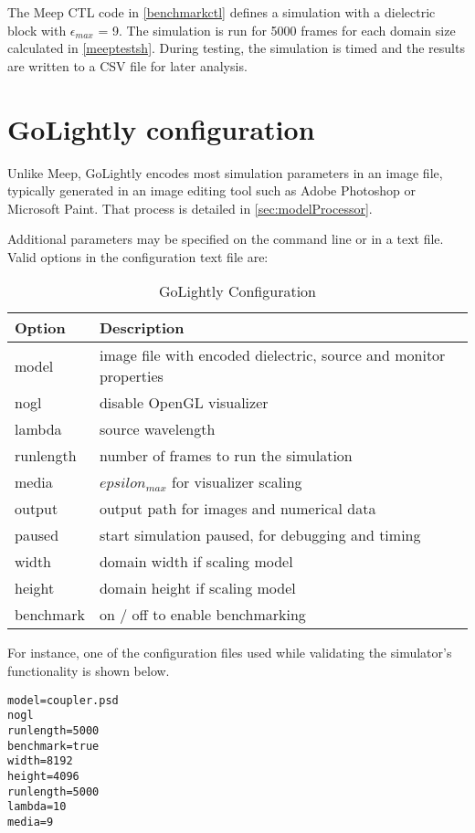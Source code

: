 


The Meep CTL code in \autoref{benchmarkctl} defines a simulation with a dielectric block with $\epsilon_{max}$ = 9. The simulation is run for 5000 frames for each domain size calculated in \autoref{meeptestsh}. During testing, the simulation is timed and the results are written to a CSV file for later analysis. 



\section{GoLightly configuration}

Unlike Meep, GoLightly encodes most simulation parameters in an image file, typically generated in an image editing tool such as Adobe Photoshop or Microsoft Paint. That process is detailed in \autoref{sec:modelProcessor}. 

Additional parameters may be specified on the command line or in a text file. Valid options in the configuration text file are:

\begin{table}[h!]
	\label{golightlyConfig}
	\centering
	\caption{GoLightly Configuration}
	\label{tab:golightlyConfigTerms}
	\begin{tabular}{l | l}
		Option	& Description \\
		\hline
			model     & image file with encoded dielectric, source and monitor properties \\
			nogl      & disable OpenGL visualizer										  \\
			lambda    & source wavelength												  \\
			runlength & number of frames to run the simulation							  \\
			media     & $epsilon_{max}$  for visualizer scaling								  \\
			output    & output path for images and numerical data						  \\
			paused    & start simulation paused, for debugging and timing				  \\
			width     & domain width if scaling model									  \\
			height    & domain height if scaling model									  \\
			benchmark & on / off to enable benchmarking									  \\
	\end{tabular}
\end{table}

For instance, one of the configuration files used while validating the simulator's functionality is shown below.

\begin{lstlisting}[caption={Samply GoLightly Configuration File},label={listing:sampleGolightlyConfig}]
model=coupler.psd
nogl
runlength=5000
benchmark=true
width=8192
height=4096
runlength=5000
lambda=10
media=9
\end{lstlisting}




